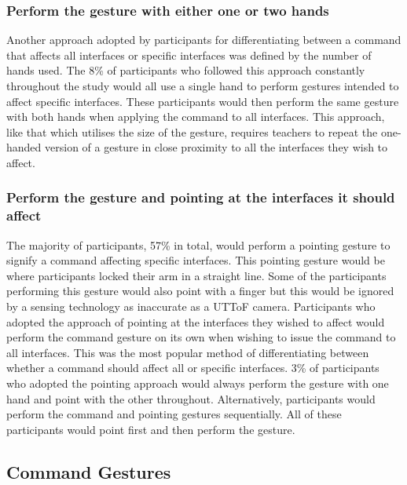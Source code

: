 \documentclass[manuscript, review, screen]{acmart}
\begin{document}
\subsubsection{Perform the gesture with either one or two hands}

Another approach adopted by participants for differentiating between a command that affects all interfaces or specific interfaces was defined by the number of hands used. 
The 8\% of participants who followed this approach constantly throughout the study would all use a single hand to perform gestures intended to affect specific interfaces.
These participants would then perform the same gesture with both hands when applying the command to all interfaces.
This approach, like that which utilises the size of the gesture, requires teachers to repeat the one-handed version of a gesture in close proximity to all the interfaces they wish to affect.

\subsubsection{Perform the gesture and pointing at the interfaces it should affect}

The majority of participants, 57\% in total, would perform a pointing gesture to signify a command affecting specific interfaces.
This pointing gesture would be where participants locked their arm in a straight line.
Some of the participants performing this gesture would also point with a finger but this would be ignored by a sensing technology as inaccurate as a \ac{UTToF} camera.
Participants who adopted the approach of pointing at the interfaces they wished to affect would perform the command gesture on its own when wishing to issue the command to all interfaces.
This was the most popular method of differentiating between whether a command should affect all or specific interfaces.
3\% of participants who adopted the pointing approach would always perform the gesture with one hand and point with the other throughout.
Alternatively, participants would perform the command and pointing gestures sequentially.
All of these participants would point first and then perform the gesture. 

\subsection{Command Gestures}
\end{document}
